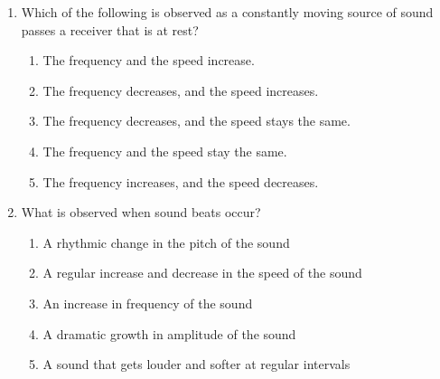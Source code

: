 \documentclass{../../../oss-apphys}
\begin{document}
\begin{multicols}{2}
\begin{enumerate}[leftmargin=18pt,resume]

  \item Which of the following is observed as a constantly moving source of
    sound passes a receiver that is at rest?
    \begin{enumerate}[nosep,leftmargin=18pt,label=(\Alph*)]
    \item The frequency and the speed increase.
    \item The frequency decreases, and the speed increases.
    \item The frequency decreases, and the speed stays the same.
    \item The frequency and the speed stay the same.
    \item The frequency increases, and the speed decreases.
    \end{enumerate}
    \vspace{.7in}
    
  \item What is observed when sound beats occur?
    \begin{enumerate}[nosep,leftmargin=18pt,label=(\Alph*)]
    \item A rhythmic change in the pitch of the sound
    \item A regular increase and decrease in the speed of the sound
    \item An increase in frequency of the sound
    \item A dramatic growth in amplitude of the sound
    \item A sound that gets louder and softer at regular intervals
    \end{enumerate}
    \vspace{.7in}
    

\end{enumerate}
\end{multicols}
\end{document}
